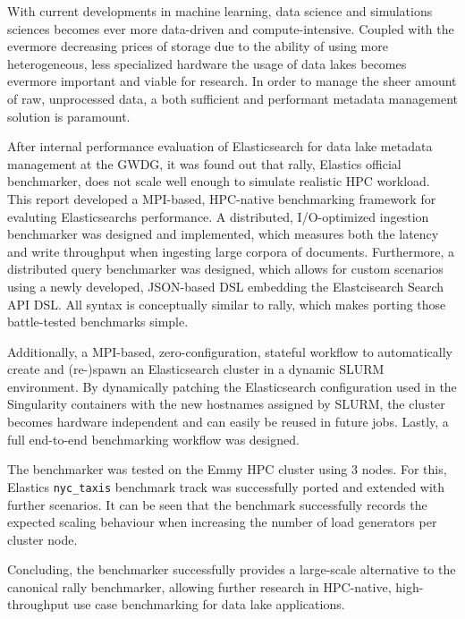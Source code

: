 With current developments in machine learning, data science and simulations sciences becomes ever more data-driven and compute-intensive. Coupled with the evermore decreasing prices of storage due to the ability of using more heterogeneous, less specialized hardware the usage of data lakes becomes evermore important and viable for research. In order to manage the sheer amount of raw, unprocessed data, a both sufficient and performant metadata management solution is paramount.

After internal performance evaluation of Elasticsearch for data lake metadata management at the GWDG, it was found out that rally, Elastics official benchmarker, does not scale well enough to simulate realistic \ac{HPC} workload. This report developed a \acs{MPI}-based, \acs{HPC}-native benchmarking framework for evaluting Elasticsearchs performance. A distributed, I/O-optimized ingestion benchmarker was designed and implemented, which measures both the latency and write throughput when ingesting large corpora of documents. Furthermore, a distributed query benchmarker was designed, which allows for custom scenarios using a newly developed, JSON-based DSL embedding the Elastcisearch Search API DSL. All syntax is conceptually similar to rally, which makes porting those battle-tested benchmarks simple.

Additionally, a \acs{MPI}-based, zero-configuration, stateful workflow to automatically create and (re-)spawn an Elasticsearch cluster in a dynamic SLURM environment. By dynamically patching the Elasticsearch configuration used in the Singularity containers with the new hostnames assigned by SLURM, the cluster becomes hardware independent and can easily be reused in future jobs. Lastly, a full end-to-end benchmarking workflow was designed.

The benchmarker was tested on the Emmy \acs{HPC} cluster using 3 nodes. For this, Elastics \texttt{nyc\_taxis} benchmark track was successfully ported and extended with further scenarios. It can be seen that the benchmark successfully records the expected scaling behaviour when increasing the number of load generators per cluster node.

Concluding, the benchmarker successfully provides a large-scale alternative to the canonical rally benchmarker, allowing further research in \ac{HPC}-native, high-throughput use case benchmarking for data lake applications.
